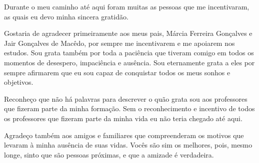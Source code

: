\begin{agradecimentos}
Durante o meu caminho até aqui foram muitas as pessoas que me incentivaram, as quais eu devo minha sincera gratidão. 

Gostaria de agradecer primeiramente aos meus pais, Márcia Ferreira Gonçalves e Jair Gonçalves de Macêdo, por sempre me incentivarem e me apoiarem nos estudos. Sou grata também por toda a paciência que tiveram comigo em todos os momentos de desespero, impaciência e ausência. Sou eternamente grata a eles por sempre afirmarem que eu sou capaz de conquistar todos os meus sonhos e objetivos.

Reconheço que não há palavras para descrever o quão grata sou aos professores que fizeram parte da minha formação. Sem o reconhecimento e incentivo de todos os professores que fizeram parte da minha vida eu não teria chegado até aqui.

Agradeço também aos amigos e familiares que compreenderam os motivos que levaram à minha ausência de suas vidas. Vocês são sim os melhores, pois, mesmo longe, sinto que são pessoas próximas, e que a amizade é verdadeira. 

\end{agradecimentos}
